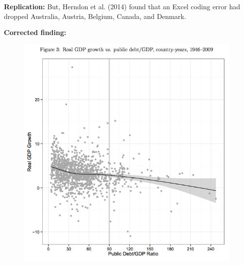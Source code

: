 \documentclass[10pt]{beamer}
\begin{document}
\begin{frame}

    \textbf{Replication:} But, Herndon et al. (2014) found that an \alert{Excel coding error} had dropped Australia, Austria, Belgium, Canada, and Denmark.

    \textbf{Corrected finding:}

    \begin{figure}
        \includegraphics[scale=0.3]{img/rr_corrected.png}
    \end{figure}

\end{frame}
\end{document}
